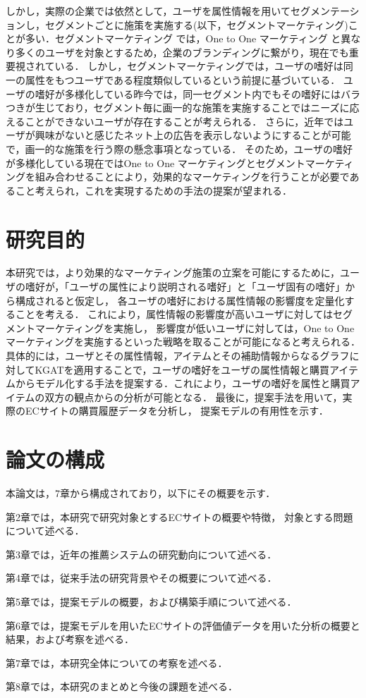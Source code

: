 しかし，実際の企業では依然として，ユーザを属性情報を用いてセグメンテーションし，セグメントごとに施策を実施する(以下，セグメントマーケティング)ことが多い．セグメントマーケティング では，One to One マーケティング と異なり多くのユーザを対象とするため，企業のブランディングに繋がり，現在でも重要視されている．
しかし，セグメントマーケティングでは，ユーザの嗜好は同一の属性をもつユーザである程度類似しているという前提に基づいている．
ユーザの嗜好が多様化している昨今では，同一セグメント内でもその嗜好にはバラつきが生じており，セグメント毎に画一的な施策を実施することではニーズに応えることができないユーザが存在することが考えられる．
さらに，近年ではユーザが興味がないと感じたネット上の広告を表示しないようにすることが可能で，画一的な施策を行う際の懸念事項となっている．
そのため，ユーザの嗜好が多様化している現在ではOne to One マーケティングとセグメントマーケティングを組み合わせることにより，効果的なマーケティングを行うことが必要であること考えられ，これを実現するための手法の提案が望まれる．


\section{研究目的}
本研究では，より効果的なマーケティング施策の立案を可能にするために，ユーザの嗜好が，「ユーザの属性により説明される嗜好」と「ユーザ固有の嗜好」から構成されると仮定し，
各ユーザの嗜好における属性情報の影響度を定量化することを考える．
これにより，属性情報の影響度が高いユーザに対してはセグメントマーケティングを実施し，
影響度が低いユーザに対しては，One to One マーケティングを実施するといった戦略を取ることが可能になると考えられる．
具体的には，ユーザとその属性情報，アイテムとその補助情報からなるグラフに対してKGATを適用することで，ユーザの嗜好をユーザの属性情報と購買アイテムからモデル化する手法を提案する．これにより，ユーザの嗜好を属性と購買アイテムの双方の観点からの分析が可能となる．
最後に，提案手法を用いて，実際のECサイトの購買履歴データを分析し，
提案モデルの有用性を示す．


\section{論文の構成}
本論文は，7章から構成されており，以下にその概要を示す．\par
第2章では，本研究で研究対象とするECサイトの概要や特徴，
対象とする問題について述べる．
\par
第3章では，近年の推薦システムの研究動向について述べる．
\par
第4章では，従来手法の研究背景やその概要について述べる．
\par
第5章では，提案モデルの概要，および構築手順について述べる．
\par
第6章では，提案モデルを用いたECサイトの評価値データを用いた分析の概要と結果，および考察を述べる．
\par
第7章では，本研究全体についての考察を述べる．
\par
第8章では，本研究のまとめと今後の課題を述べる．


